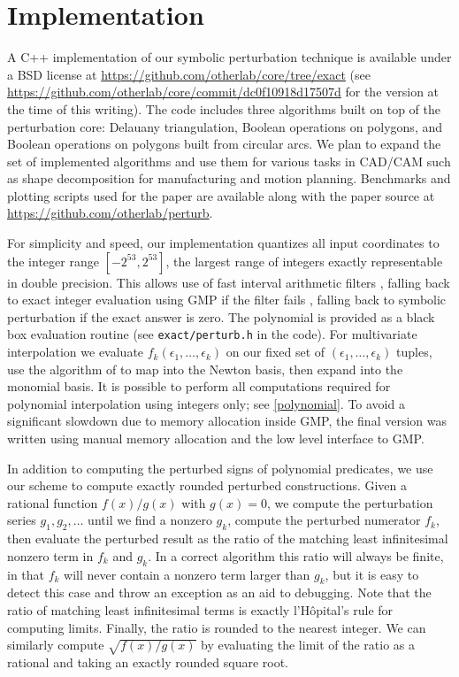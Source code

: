 \documentclass[11pt]{article}
\begin{document}
\section{Implementation}

A C++ implementation of our symbolic perturbation technique is available under a BSD license at \url{https://github.com/otherlab/core/tree/exact} (see 
\url{https://github.com/otherlab/core/commit/dc0f10918d17507d} for the version at the time of this writing).  The code includes three algorithms built on top of the perturbation
core: Delauany triangulation, Boolean operations on polygons, and Boolean operations on polygons built from circular arcs.  We plan to expand the set of implemented algorithms
and use them for various tasks in CAD/CAM such as shape decomposition for manufacturing and motion planning.  Benchmarks and plotting scripts used for the
paper are available along with the paper source at \url{https://github.com/otherlab/perturb}.

For simplicity and speed, our implementation quantizes all input coordinates to the integer range $[-2^{53},2^{53}]$, the largest range of integers exactly representable in
double precision.  This allows use of fast interval arithmetic filters \cite{bronnimann2001interval}, falling back to exact integer evaluation using GMP if the filter fails \cite{granlund2012gmp},
falling back to symbolic perturbation if the exact answer is zero.  The polynomial is provided as a black box evaluation routine (see \verb+exact/perturb.h+ in the code).  For multivariate
interpolation we evaluate $f_k(\epsilon_1, \ldots, \epsilon_k)$ on our fixed set of $(\epsilon_1, \ldots, \epsilon_k)$ tuples, use the algorithm of \cite{neidinger2009multivariable}
to map into the Newton basis, then expand into the monomial basis.  It is possible to perform all computations required for polynomial interpolation using integers only; see \autoref{polynomial}.
To avoid a significant slowdown due to memory allocation inside GMP, the final version was written using manual memory allocation and the low level interface to GMP.

In addition to computing the perturbed signs of polynomial predicates, we use our scheme to compute exactly rounded perturbed constructions.  Given a rational function $f(x)/g(x)$
with $g(x) = 0$, we compute the perturbation series $g_1, g_2, \ldots$ until we find a nonzero $g_k$, compute the perturbed numerator $f_k$, then evaluate the perturbed result as
the ratio of the matching least infinitesimal nonzero term in $f_k$ and $g_k$.  In a correct algorithm this ratio will always be finite, in that $f_k$ will never contain a nonzero term
larger than $g_k$, but it is easy to detect this case and throw an exception as an aid to debugging.  Note that the ratio of matching least infinitesimal terms is exactly l'H\^opital's
rule for computing limits.  Finally, the ratio is rounded to the nearest integer.  We can similarly compute $\sqrt{f(x)/g(x)}$ by evaluating the limit of the ratio as a rational and
taking an exactly rounded square root.
\end{document}
